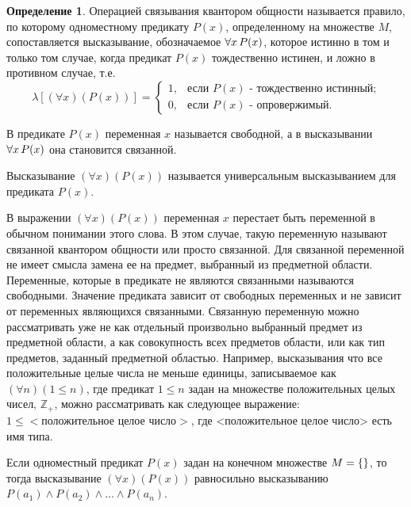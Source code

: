 \documentclass[letterpaper, 10pt]{article}
\theoremstyle{definition}
\newtheorem{define}[thm]{Определение}
\begin{document}
	\begin{define}
		Операцией связывания квантором общности называется правило, по которому
		одноместному предикату $P(x)$, определенному на множестве $M$,
		сопоставляется высказывание, обозначаемое $\forall x\,P(x)$, которое
		истинно в том и только том случае, когда предикат $P(x)$ тождественно
		истинен, и ложно в противном случае, т.е.
		\[
			\lambda[(\forall x)(P(x))] = 
			\begin{cases}
				1, & \text{если } P(x) \text{ - тождественно истинный;} \\
				0, & \text{если } P(x) \text{ - опровержимый.}
			\end{cases}
		\]
	\end{define}

	В предикате $P(x)$ переменная $x$ называется свободной, а в высказывании
	$\forall x\, P(x)$ она становится связанной.

	Высказывание $(\forall x)(P(x))$ называется универсальным высказыванием для
	предиката $P(x)$. 

	В выражении $(\forall x)(P(x))$ переменная $x$ перестает быть переменной в
	обычном понимании этого слова. В этом случае, такую переменную называют связанной 
	квантором общности или просто связанной.
	Для связанной переменной не имеет смысла замена ее на предмет, выбранный
	из предметной области. Переменные, которые в предикате не являются
	связанными называются свободными.
	Значение предиката зависит от свободных переменных и не зависит от
	переменных являющихся связанными.
	Связанную переменную можно рассматривать уже не как отдельный произвольно
	выбранный предмет из предметной области, а как совокупность всех предметов
	области, или как тип предметов, заданный предметной областью. Например,
	высказывания что все положительные целые числа не меньше единицы,
	записываемое как $(\forall n)(1 \leq n)$, где предикат $1 \leq n$ задан на
	множестве положительных целых чисел, $\mathbb{Z}_+$, можно рассматривать как
	следующее выражение: $1 \leq <\text{положительное целое число}>$, где
	<положительное целое число> есть имя типа. 

	Если одноместный предикат $P(x)$ задан на конечном множестве $M = \set{\rseq
	a}$, то тогда высказывание $(\forall x)(P(x))$ равносильно высказыванию
	$P(a_1) \land P(a_2) \land \ldots \land P(a_n)$.
\end{document}
